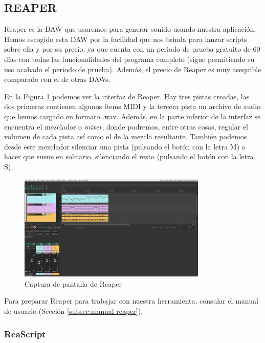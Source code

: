 \subsection{REAPER}\label{sec:reaper}
Reaper es la DAW que usaremos para generar sonido usando nuestra aplicación. Hemos escogido esta DAW por la facilidad que nos brinda para lanzar scripts sobre ella y por su precio, ya que cuenta con un periodo de prueba gratuito de 60 días con todas las funcionalidades del programa completo (sigue permitiendo su uso acabado el periodo de prueba). Además, el precio de Reaper es muy asequible comparado con el de otras DAWs.

En la Figura \ref{fig:captura-reaper} podemos ver la interfaz de Reaper. Hay tres pistas creadas, las dos primeras contienen algunos ítems MIDI y la tercera pista un archivo de audio que hemos cargado en formato .wav. Además, en la parte inferior de la interfaz se encuentra el mezclador o \textit{mixer}, donde podremos, entre otras cosas, regular el volumen de cada pista así como el de la mezcla resultante. También podemos desde este mezclador silenciar una pista (pulsando el botón con la letra M) o hacer que suene en solitario, silenciando el resto (pulsando el botón con la letra S).

\begin{figure}[h]
    \centering
    \includegraphics[width = 0.8\textwidth]{Imagenes/Bitmap/CapturaReaper.png}
    \caption{Captura de pantalla de Reaper}
    \label{fig:captura-reaper}
\end{figure}

Para preparar Reaper para trabajar con nuestra herramienta, consular el manual de usuario (Sección \ref{subsec:manual-reaper}).

\subsubsection{ReaScript}\label{subsec:reascripy}

